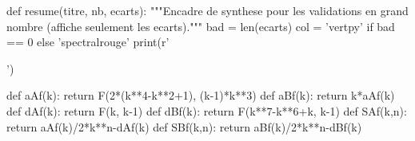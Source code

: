 \documentclass[11pt,a4paper]{article}
\begin{document}
\begin{pycode}
def resume(titre, nb, ecarts):
    """Encadre de synthese pour les validations en grand nombre (affiche seulement les ecarts)."""
    bad = len(ecarts)
    col = 'vertpy' if bad == 0 else 'spectralrouge'
    print(r'')

def aAf(k): return F(2*(k**4-k**2+1), (k-1)*k**3)
def aBf(k): return k*aAf(k)
def dAf(k): return F(k, k-1)
def dBf(k): return F(k**7-k**6+k, k-1)
def SAf(k,n): return aAf(k)/2*k**n-dAf(k)
def SBf(k,n): return aBf(k)/2*k**n-dBf(k)
\end{pycode}
\end{document}
